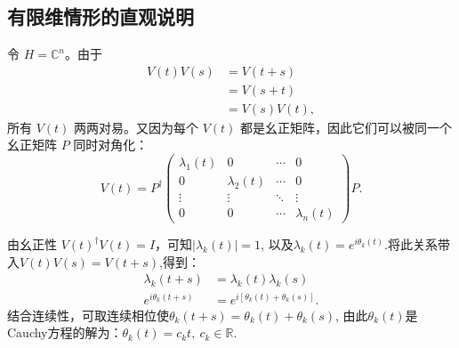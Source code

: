 \documentclass[UTF8,a4paper,11pt,openany]{ctexbook}
\begin{document}
\subsection{有限维情形的直观说明}

令 $H=\mathbb C^n$。由于
\begin{align}
    V(t)V(s)
    &=V(t+s)
    \nonumber\\
    &=V(s+t)
    \nonumber\\
    &=V(s)V(t),
\end{align}
所有 $V(t)$ 两两对易。又因为每个 $V(t)$ 都是幺正矩阵，因此它们可以被同一个幺正矩阵 $P$ 同时对角化：
\begin{equation}
    V(t)
    =
    P^\dagger
    \begin{pmatrix}
        \lambda_1(t) & 0 & \cdots & 0\\
        0 & \lambda_2(t) & \cdots & 0\\
        \vdots & \vdots & \ddots & \vdots\\
        0 & 0 & \cdots & \lambda_n(t)
    \end{pmatrix}
    P.
\end{equation}

由幺正性 $V(t)^\dagger V(t)=I$，可知$|\lambda_k(t)|=1$, 以及$\lambda_k(t)=e^{i\theta_k(t)}.$将此关系带入$V(t)V(s)=V(t+s)$,得到：
\begin{align}
    \lambda_k(t+s)
    &=\lambda_k(t)\lambda_k(s)
    \nonumber\\
    e^{i\theta_k(t+s)}
    &=
    e^{i[\theta_k(t)+\theta_k(s)]}.
\end{align}
结合连续性，可取连续相位使$\theta_k(t+s)=\theta_k(t)+\theta_k(s)$, 由此$\theta_k(t)$是Cauchy方程的解为：$\theta_k(t)=c_k t,~ c_k\in\mathbb R.$
\end{document}
